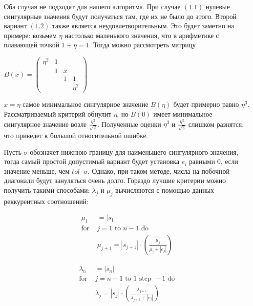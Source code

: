 \documentclass[12pt, a4paper]{report}
\theoremstyle{note}
\begin{document}
Оба случая не подходят для нашего алгоритма. При случае $(1.1)$ нулевые сингулярные значения будут получаться там, где их не было до этого. Второй вариант $(1.2)$ также является неудовлетворительным. Это будет заметно на примере: возьмем $\eta$ настолько маленького значения, что в арифметике с плавающей точкой $1+\eta=1$. Тогда можно рассмотреть матрицу
\begin{center}
$B(x)=\begin{pmatrix}
    \eta^2&1&&\\
    &1&x\\
    &&1&1\\
    &&&\eta^2
\end{pmatrix}$
\end{center}

 $x=\eta$ самое минимальное сингулярное значение $B(\eta)$ будет примерно равно $\eta^3$. Рассматриваемый критерий обнулит $\eta$, но $B(0)$ имеет минимальное сингулярное значение возле $\frac{\eta^2}{\sqrt{2}}$. Полученные оценки $\eta^3$ и $\frac{\eta^2}{\sqrt{2}}$ слишком разнятся, что приведет к большой относительной ошибке.

Пусть $\sigma$ обозначет нижнюю границу для наименьшего сингулярного значения, тогда самый простой допустимый вариант будет установка $e_i$ равными 0, если значение меньше, чем $tol\cdot\sigma$. Однако, при таком методе, числа на побочной диагонали будут зануляться очень долго. Гораздо лучшие критерии можно получить такими способами:
$\lambda_j$ и $\mu_j$ вычисляются с помощью данных реккурентных соотношений:

\begin{minipage}{0.48\textwidth}
\begin{align*}
\mu_1& = |s_1| \\
\text{for }& j = 1 \text{ to } n-1 \text{ do} \\
&\mu_{j+1} = |s_{j+1}| \cdot \left( \frac{\mu_j}{\mu_j + |e_j|} \right)
\end{align*}
\end{minipage}
\hfill
\begin{minipage}{0.48\textwidth}
\begin{align*}
\lambda_n& = |s_n| \\
\text{for }& j = n-1 \text{ to } 1 \text{ step } -1 \text{ do} \\
&\lambda_j = |s_j| \cdot \left( \frac{\lambda_{j+1}}{\lambda_{j+1} + |e_j|} \right)
\end{align*}
\end{minipage}
\vspace{1em}
\end{document}
